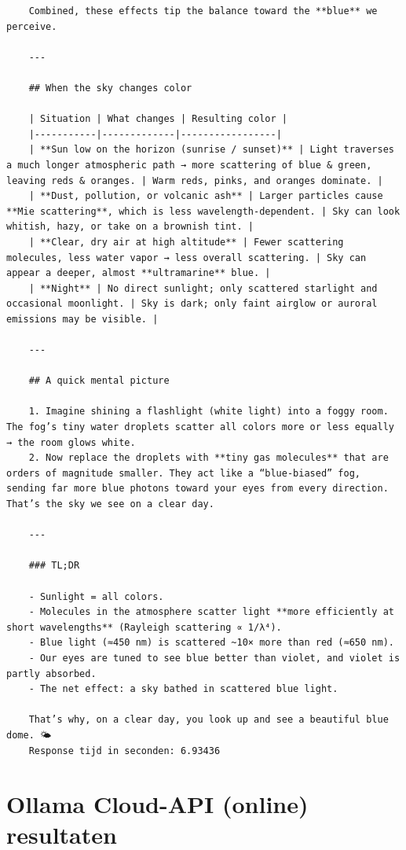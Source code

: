 \begin{verbatim}
    Combined, these effects tip the balance toward the **blue** we perceive.
    
    ---
    
    ## When the sky changes color
    
    | Situation | What changes | Resulting color |
    |-----------|-------------|-----------------|
    | **Sun low on the horizon (sunrise / sunset)** | Light traverses a much longer atmospheric path → more scattering of blue & green, leaving reds & oranges. | Warm reds, pinks, and oranges dominate. |
    | **Dust, pollution, or volcanic ash** | Larger particles cause **Mie scattering**, which is less wavelength‑dependent. | Sky can look whitish, hazy, or take on a brownish tint. |
    | **Clear, dry air at high altitude** | Fewer scattering molecules, less water vapor → less overall scattering. | Sky can appear a deeper, almost **ultramarine** blue. |
    | **Night** | No direct sunlight; only scattered starlight and occasional moonlight. | Sky is dark; only faint airglow or auroral emissions may be visible. |
    
    ---
    
    ## A quick mental picture
    
    1. Imagine shining a flashlight (white light) into a foggy room. The fog’s tiny water droplets scatter all colors more or less equally → the room glows white.  
    2. Now replace the droplets with **tiny gas molecules** that are orders of magnitude smaller. They act like a “blue‑biased” fog, sending far more blue photons toward your eyes from every direction. That’s the sky we see on a clear day.
    
    ---
    
    ### TL;DR
    
    - Sunlight = all colors.  
    - Molecules in the atmosphere scatter light **more efficiently at short wavelengths** (Rayleigh scattering ∝ 1/λ⁴).  
    - Blue light (≈450 nm) is scattered ~10× more than red (≈650 nm).  
    - Our eyes are tuned to see blue better than violet, and violet is partly absorbed.  
    - The net effect: a sky bathed in scattered blue light.  
    
    That’s why, on a clear day, you look up and see a beautiful blue dome. 🌤️
    Response tijd in seconden: 6.93436 
\end{verbatim}

\section{Ollama Cloud-API (online) resultaten}
\label{sec:ollamacloudapionlineresultaten}

